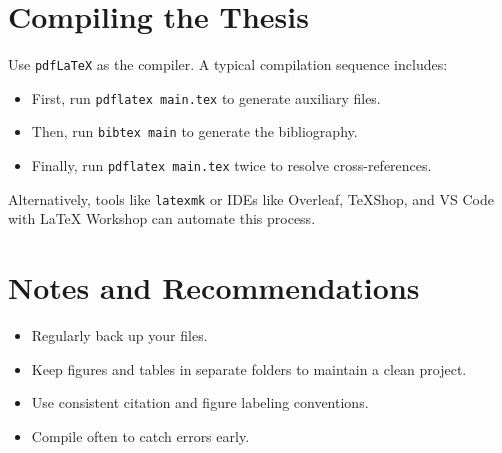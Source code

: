 \section{Compiling the Thesis}
\begin{paragraph}
Use \texttt{pdfLaTeX} as the compiler. A typical compilation sequence includes:
\begin{itemize}[leftmargin=\paritemindent]
    \item First, run \texttt{pdflatex main.tex} to generate auxiliary files.
    \item Then, run \texttt{bibtex main} to generate the bibliography.
    \item Finally, run \texttt{pdflatex main.tex} twice to resolve cross-references.
\end{itemize}

Alternatively, tools like \texttt{latexmk} or IDEs like Overleaf, TeXShop, and VS Code with LaTeX Workshop can automate this process.
\end{paragraph}

\section{Notes and Recommendations}
\begin{paragraph}
\begin{itemize}[leftmargin=\paritemindent]
    \item Regularly back up your files.
    \item Keep figures and tables in separate folders to maintain a clean project.
    \item Use consistent citation and figure labeling conventions.
    \item Compile often to catch errors early.
\end{itemize}
\end{paragraph}
